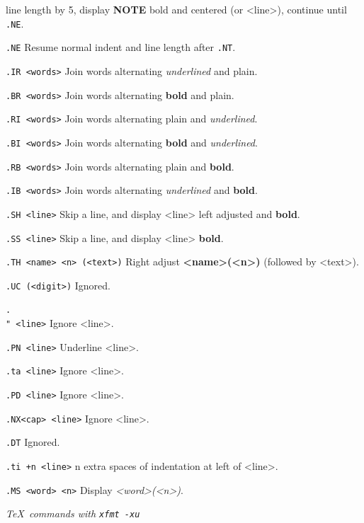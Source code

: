 			line length by 5, display {\bf NOTE} bold and
			centered (or <line>), continue until {\tt .NE}.
\item{\tt .NE}		Resume normal indent and line length after
			{\tt .NT}.
\item{\tt .IR~<words>}	Join words alternating {\it underlined} and plain.
\item{\tt .BR~<words>}	Join words alternating {\bf bold} and plain.
\item{\tt .RI~<words>}	Join words alternating plain and {\it underlined}.
\item{\tt .BI~<words>}	Join words alternating {\bf bold} and {\it underlined}.
\item{\tt .RB~<words>}	Join words alternating plain and {\bf bold}.
\item{\tt .IB~<words>}	Join words alternating {\it underlined} and {\bf bold}.
\item{\tt .SH~<line>}	Skip a line, and display <line> left adjusted
			and {\bf bold}.
\item{\tt .SS~<line>}	Skip a line, and display <line> {\bf bold}.
\item{\tt .TH~<name>~<n>~(<text>)}
			Right adjust {\bf <name>(<n>)} (followed by <text>).
\item{\tt .UC~(<digit>)}
			Ignored.
\item{\tt .\\"~<line>}	Ignore <line>.
\item{\tt .PN~<line>}	Underline <line>.
\item{\tt .ta~<line>}	Ignore <line>.
\item{\tt .PD~<line>}	Ignore <line>.
\item{\tt .NX<cap>~<line>}
			Ignore <line>.
\item{\tt .DT}		Ignored.
\item{\tt .ti~+n~<line>}
			n extra spaces of indentation at left of <line>.
\item{\tt .MS~<word>~<n>}
			Display {\it <word>(<n>)}.


\bigskip
\centerline{\it \TeX ~commands with \tt xfmt~-xu}
\medskip

